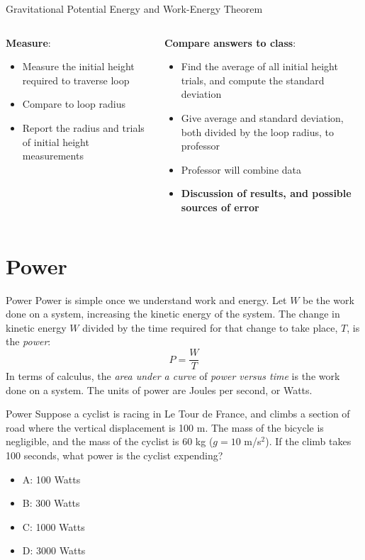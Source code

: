 \documentclass{beamer}
\begin{document}
\begin{frame}{Gravitational Potential Energy and Work-Energy Theorem}
\small
\begin{columns}[T]
\begin{column}{0.5\textwidth}
\textbf{Measure}:
\begin{itemize}
\item Measure the initial height required to traverse loop
\item Compare to loop radius
\item Report the radius and trials of initial height measurements
\end{itemize}
\end{column}
\begin{column}{0.5\textwidth}
\textbf{Compare answers to class}:
\begin{itemize}
\item Find the average of all initial height trials, and compute the standard deviation
\item Give average and standard deviation, both divided by the loop radius, to professor
\item Professor will combine data
\item \textbf{Discussion of results, and possible sources of error}
\end{itemize}
\end{column}
\end{columns}
\end{frame}

\section{Power}

\begin{frame}{Power}
Power is simple once we understand work and energy.  Let $W$ be the work done on a system, increasing the kinetic energy of the system.  The change in kinetic energy $W$ divided by the time required for that change to take place, $T$, is the \alert{\textit{power}}:
\begin{equation}
\boxed{
P = \frac{W}{T}
}
\end{equation}
In terms of calculus, the \textit{area under a curve} of \textit{power versus time} is the work done on a system.  The units of power are Joules per second, or Watts.
\end{frame}

\begin{frame}{Power}
Suppose a cyclist is racing in Le Tour de France, and climbs a section of road where the vertical displacement is 100 m.  The mass of the bicycle is negligible, and the mass of the cyclist is 60 kg ($g = 10$ m/s$^2$).  If the climb takes 100 seconds, what power is the cyclist expending?
\begin{itemize}
\item A: 100 Watts
\item B: 300 Watts
\item C: 1000 Watts
\item D: 3000 Watts
\end{itemize}
\end{frame}
\end{document}
